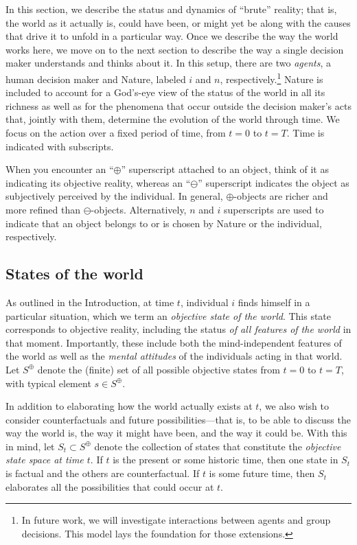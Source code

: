 \documentclass[
11pt,
titlepage,
reqno,
]{article}%
\theoremstyle{definition}
\begin{document}
In this section, we describe the status and dynamics of ``brute'' reality; that is, the world as it actually is, could have been, or might yet be along with the causes that drive it to unfold in a particular way. 
Once we describe the way the world works here, we move on to the next section to describe the way a single decision maker understands and thinks about it.
In this setup, there are two \textit{agents}, a human decision maker and Nature, labeled $i$ and $n$, respectively.\footnote
{
	In future work, we will investigate interactions between agents and group decisions.
		This model lays the foundation for those extensions.
} 
Nature is included to account for  a God's-eye view of the status of the world in all its richness as well as for the phenomena that occur outside the decision maker's acts that, jointly with them, determine the evolution of the world through time.
We focus on the action over a fixed period of time, from $t=0$ to $t=T$. 
Time is indicated with subscripts.
	
When you encounter an ``$\oplus$'' superscript attached to an object, think of it as indicating its objective reality, whereas an ``$\ominus$'' superscript indicates the object as subjectively perceived by the individual.
In general, $\oplus$-objects are richer and more refined than $\ominus$-objects. 
Alternatively, $n$ and $i$ superscripts are used to indicate that an object belongs to or is chosen by Nature or the individual, respectively.
	
	
	
	
\subsection{States of the world\label{sec:states}}
	
As outlined in the Introduction, at time $t$, individual $i$ finds himself in a particular situation, which we term an \textit{objective state of the world}.
This state corresponds to objective reality, including the status \textit{of all features of the world} in that moment. 
Importantly, these include both the  mind-independent features of the world as well as the \textit{mental attitudes} of the individuals acting in that world. 
Let $S^\oplus$ denote the (finite) set of all possible objective states from $t=0$ to $t=T$, with typical element $s\in S^\oplus$.

In addition to elaborating how the world actually exists at $t$, we also wish to consider counterfactuals and future possibilities---that is, to be able to discuss the way the world is, the way it might have been, and the way it could be.
With this in mind, let $S_t\subset S^\oplus$ denote the collection of states that constitute the \textit{objective state space at time $t$}. 
If $t$ is the present or some historic time, then one state in  $S_t$ is factual and the others are counterfactual. 
If $t$ is some future time, then $S_t$ elaborates all the possibilities that could occur at $t$.
\end{document}
